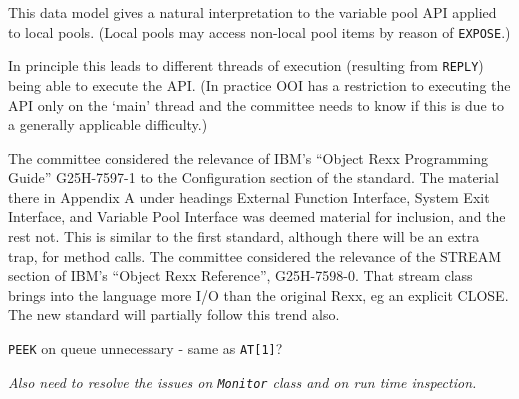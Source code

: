 This data model gives a natural interpretation to the variable pool API
applied to local pools. (Local pools may access non-local pool items by
reason of \texttt{EXPOSE}.)

In principle this leads to different threads of execution (resulting
from \texttt{REPLY}) being able to execute the API. (In practice OOI has
a restriction to executing the API only on the `main' thread and the
committee needs to know if this is due to a generally applicable
difficulty.)

The committee considered the relevance of IBM's ``Object Rexx
Programming Guide'' G25H-7597-1 to the Configuration section of the
standard. The material there in Appendix A under headings External
Function Interface, System Exit Interface, and Variable Pool Interface
was deemed material for inclusion, and the rest not. This is similar to
the first standard, although there will be an extra trap, for method
calls. The committee considered the relevance of the STREAM section of
IBM's ``Object Rexx Reference'', G25H-7598-0. That stream class brings
into the language more I/O than the original Rexx, eg an explicit CLOSE.
The new standard will partially follow this trend also.

\texttt{PEEK} on queue unnecessary - same as \texttt{AT{[}1{]}}?

\emph{Also need to resolve the issues on \texttt{Monitor} class and on
run time inspection.}
